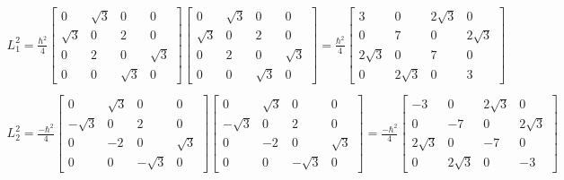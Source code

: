\begin{equation}
  \begin{array}{c}
    L_1^2 = \frac{\hbar^2}{4}\left[\begin{matrix}
      0 & \sqrt{3} & 0 & 0\\
      \sqrt{3} & 0 & 2 & 0\\
      0 & 2 & 0 & \sqrt{3}\\
      0 & 0 & \sqrt{3} & 0
    \end{matrix}\right]\left[\begin{matrix}
      0 & \sqrt{3} & 0 & 0\\
      \sqrt{3} & 0 & 2 & 0\\
      0 & 2 & 0 & \sqrt{3}\\
      0 & 0 & \sqrt{3} & 0
    \end{matrix}\right] =
    \frac{\hbar^2}{4}\left[\begin{matrix}
      3 & 0 & 2\sqrt{3} & 0\\
      0 & 7 & 0 & 2\sqrt{3}\\
      2\sqrt{3} & 0 & 7 & 0\\
      0 & 2\sqrt{3} & 0 & 3
    \end{matrix}\right]
    \\

    \\
    L_2^2 = \frac{-\hbar^2}{4}\left[\begin{matrix}
      0 & \sqrt{3} & 0 & 0\\
      -\sqrt{3} & 0 & 2 & 0\\
      0 & -2 & 0 & \sqrt{3}\\
      0 & 0 & -\sqrt{3} & 0
    \end{matrix}\right]\left[\begin{matrix}
      0 & \sqrt{3} & 0 & 0\\
      -\sqrt{3} & 0 & 2 & 0\\
      0 & -2 & 0 & \sqrt{3}\\
      0 & 0 & -\sqrt{3} & 0
    \end{matrix}\right] =
    \frac{-\hbar^2}{4}\left[\begin{matrix}
      -3 & 0 & 2\sqrt{3} & 0\\
      0 & -7 & 0 & 2\sqrt{3}\\
      2\sqrt{3} & 0 & -7 & 0\\
      0 & 2\sqrt{3} & 0 & -3
    \end{matrix}\right]
    \\


\end{array}
\end{equation}
